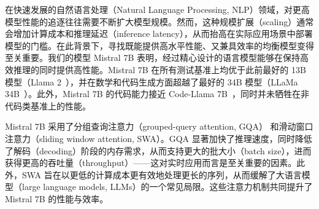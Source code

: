 \documentclass[a4paper,11pt]{article}
\providecommand{\bipar}[2]{#2}
\begin{document}
\bipar{In the rapidly evolving domain of Natural Language Processing (NLP), the race towards higher model performance often necessitates an escalation in model size. However, this scaling tends to increase computational costs and inference latency, thereby raising barriers to deployment in practical, real-world scenarios. In this context, the search for balanced models delivering both high-level performance and efficiency becomes critically essential. Our model, Mistral 7B, demonstrates that a carefully designed language model can deliver high performance while maintaining an efficient inference. Mistral 7B outperforms the previous best 13B model (Llama 2, \cite{ref26}) across all tested benchmarks, and surpasses the best 34B model (LLaMa 34B, \cite{ref25}) in mathematics and code generation. Furthermore, Mistral 7B approaches the coding performance of Code-Llama 7B \cite{ref20}, without sacrificing performance on non-code related benchmarks.}{在快速发展的自然语言处理（Natural Language Processing, NLP）领域，对更高模型性能的追逐往往需要不断扩大模型规模。然而，这种规模扩展（scaling）通常会增加计算成本和推理延迟（inference latency），从而抬高在实际应用场景中部署模型的门槛。在此背景下，寻找既能提供高水平性能、又兼具效率的均衡模型变得至关重要。我们的模型 Mistral 7B 表明，经过精心设计的语言模型能够在保持高效推理的同时提供高性能。Mistral 7B 在所有测试基准上均优于此前最好的 13B 模型（Llama 2~\cite{ref26}），并在数学和代码生成方面超越了最好的 34B 模型（LLaMa 34B~\cite{ref25}）。此外，Mistral 7B 的代码能力接近 Code-Llama 7B~\cite{ref20}，同时并未牺牲在非代码类基准上的性能。}

\bipar{Mistral 7B leverages grouped-query attention (GQA) \cite{ref1}, and sliding window attention (SWA) \cite{ref6,ref3}. GQA significantly accelerates the inference speed, and also reduces the memory requirement during decoding, allowing for higher batch sizes hence higher throughput, a crucial factor for real-time applications. In addition, SWA is designed to handle longer sequences more effectively at a reduced computational cost, thereby alleviating a common limitation in LLMs. These attention mechanisms collectively contribute to the enhanced performance and efficiency of Mistral 7B.}{Mistral 7B 采用了分组查询注意力（grouped-query attention, GQA）\cite{ref1} 和滑动窗口注意力（sliding window attention, SWA）\cite{ref6,ref3}。GQA 显著加快了推理速度，同时降低了解码（decoding）阶段的内存需求，从而支持更大的批大小（batch size），进而获得更高的吞吐量（throughput）——这对实时应用而言是至关重要的因素。此外，SWA 旨在以更低的计算成本更有效地处理更长的序列，从而缓解了大语言模型（large language models, LLMs）的一个常见局限。这些注意力机制共同提升了 Mistral 7B 的性能与效率。}
\end{document}
